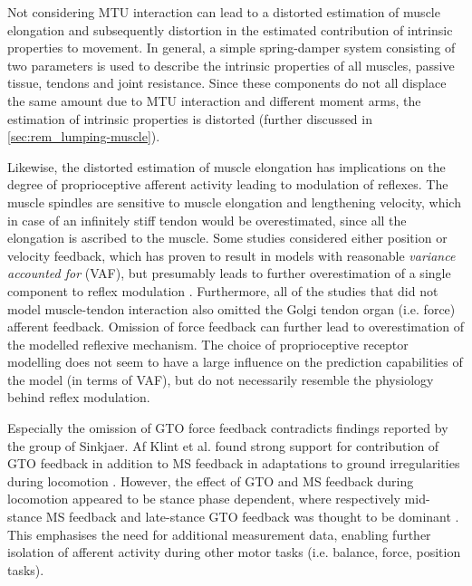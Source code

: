 Not considering MTU interaction can lead to a distorted estimation of muscle elongation and subsequently distortion in the estimated contribution of intrinsic properties to movement. In general, a simple spring-damper system consisting of two parameters is used to describe the intrinsic properties of all muscles, passive tissue, tendons and joint resistance. Since these components do not all displace the same amount due to MTU interaction and different moment arms, the estimation of intrinsic properties is distorted (further discussed in \autoref{sec:rem_lumping-muscle}). 

Likewise, the distorted estimation of muscle elongation has implications on the degree of proprioceptive afferent activity leading to modulation of reflexes. The muscle spindles are sensitive to muscle elongation and lengthening velocity, which in case of an infinitely stiff tendon would be overestimated, since all the elongation is ascribed to the muscle. Some studies considered either position or velocity feedback, which has proven to result in models with reasonable \textit{variance accounted for} (VAF), but presumably leads to further overestimation of a single component to reflex modulation \cite{maas_is_2009}. Furthermore, all of the studies that did not model muscle-tendon interaction also omitted the Golgi tendon organ (i.e. force) afferent feedback. Omission of force feedback can further lead to overestimation of the modelled reflexive mechanism. The choice of proprioceptive receptor modelling does not seem to have a large influence on the prediction capabilities of the model (in terms of VAF), but do not necessarily resemble the physiology behind reflex modulation. 

Especially the omission of GTO force feedback contradicts findings reported by the group of Sinkjaer. Af Klint et al. found strong support for contribution of GTO feedback in addition to MS feedback in adaptations to ground irregularities during locomotion \cite{klint_afferent_2009}. However, the effect of GTO and MS feedback during locomotion appeared to be stance phase dependent, where respectively mid-stance MS feedback and late-stance GTO feedback was thought to be dominant \cite{grey_positive_2007, af_klint_sudden_2009}. This emphasises the need for additional measurement data, enabling further isolation of afferent activity during other motor tasks (i.e. balance, force, position tasks). 

